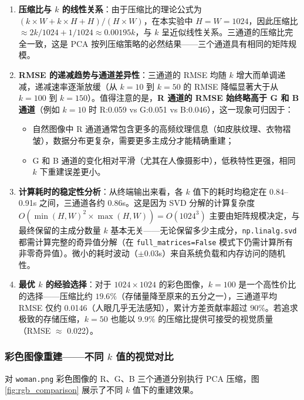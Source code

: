 \documentclass[a4paper]{article}
\begin{document}
\begin{enumerate}
    \item \textbf{压缩比与 $k$ 的线性关系}：由于压缩比的理论公式为 $(k \times W + k \times H + H) / (H \times W)$，在本实验中 $H = W = 1024$，因此压缩比 $\approx 2k/1024 + 1/1024 \approx 0.00195k$，与 $k$ 呈近似线性关系。三通道的压缩比完全一致，这是 PCA 按列压缩策略的必然结果——三个通道具有相同的矩阵规模。

    \item \textbf{RMSE 的递减趋势与通道差异性}：三通道的 RMSE 均随 $k$ 增大而单调递减，递减速率逐渐放缓（从 $k=10$ 到 $k=50$ 的 RMSE 降幅显著大于从 $k=100$ 到 $k=150$）。值得注意的是，\textbf{R 通道的 RMSE 始终略高于 G 和 B 通道}（例如 $k=10$ 时 R:0.059 vs G:0.051 vs B:0.046），这一现象可归因于：
        \begin{itemize}
            \item 自然图像中 R 通道通常包含更多的高频纹理信息（如皮肤纹理、衣物褶皱），数据分布更复杂，需要更多主成分才能精确重建；
            \item G 和 B 通道的变化相对平滑（尤其在人像摄影中），低秩特性更强，相同 $k$ 下重建误差更小。
        \end{itemize}

    \item \textbf{计算耗时的稳定性分析}：从终端输出来看，各 $k$ 值下的耗时均稳定在 0.84--0.91s 之间，三通道各约 0.86s。这是因为 SVD 分解的计算复杂度 $O(\min(H,W)^2 \times \max(H,W)) = O(1024^3)$ 主要由矩阵规模决定，与最终保留的主成分数量 $k$ 基本无关——无论保留多少主成分，\texttt{np.linalg.svd} 都需计算完整的奇异值分解（在 \texttt{full\_matrices=False} 模式下仍需计算所有非零奇异值）。微小的耗时波动（$\pm 0.03$s）来自系统负载和内存访问的随机性。

    \item \textbf{最优 $k$ 的经验选择}：对于 $1024 \times 1024$ 的彩色图像，$k=100$ 是一个高性价比的选择——压缩比约 $19.6\%$（存储量降至原来的五分之一），三通道平均 RMSE 仅约 0.0146（人眼几乎无法感知），累计方差贡献率超过 $90\%$。若追求极致的存储压缩，$k=50$ 也能以 $9.9\%$ 的压缩比提供可接受的视觉质量（RMSE $\approx$ 0.022）。
\end{enumerate}

\subsubsection{彩色图像重建——不同 $k$ 值的视觉对比}

对 \texttt{woman.png} 彩色图像的 R、G、B 三个通道分别执行 PCA 压缩，图 \ref{fig:rgb_comparison} 展示了不同 $k$ 值下的重建效果。
\end{document}
